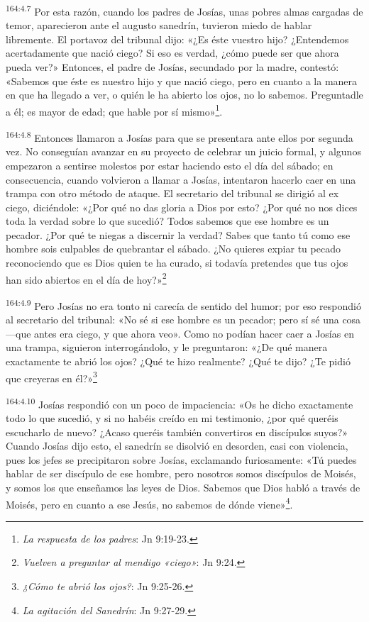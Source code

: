 \par
\textsuperscript{164:4.7} Por esta razón, cuando los padres de Josías, unas pobres almas cargadas de temor, aparecieron ante el augusto sanedrín, tuvieron miedo de hablar libremente. El portavoz del tribunal dijo: «¿Es éste vuestro hijo? ¿Entendemos acertadamente que nació ciego? Si eso es verdad, ¿cómo puede ser que ahora pueda ver?» Entonces, el padre de Josías, secundado por la madre, contestó: «Sabemos que éste es nuestro hijo y que nació ciego, pero en cuanto a la manera en que ha llegado a ver, o quién le ha abierto los ojos, no lo sabemos. Preguntadle a él; es mayor de edad; que hable por sí mismo»\footnote{\textit{La respuesta de los padres}: Jn 9:19-23.}.

\par
\textsuperscript{164:4.8} Entonces llamaron a Josías para que se presentara ante ellos por segunda vez. No conseguían avanzar en su proyecto de celebrar un juicio formal, y algunos empezaron a sentirse molestos por estar haciendo esto el día del sábado; en consecuencia, cuando volvieron a llamar a Josías, intentaron hacerlo caer en una trampa con otro método de ataque. El secretario del tribunal se dirigió al ex ciego, diciéndole: «¿Por qué no das gloria a Dios por esto? ¿Por qué no nos dices toda la verdad sobre lo que sucedió? Todos sabemos que ese hombre es un pecador. ¿Por qué te niegas a discernir la verdad? Sabes que tanto tú como ese hombre sois culpables de quebrantar el sábado. ¿No quieres expiar tu pecado reconociendo que es Dios quien te ha curado, si todavía pretendes que tus ojos han sido abiertos en el día de hoy?»\footnote{\textit{Vuelven a preguntar al mendigo «ciego»}: Jn 9:24.}

\par
\textsuperscript{164:4.9} Pero Josías no era tonto ni carecía de sentido del humor; por eso respondió al secretario del tribunal: «No sé si ese hombre es un pecador; pero sí sé una cosa ---que antes era ciego, y que ahora veo». Como no podían hacer caer a Josías en una trampa, siguieron interrogándolo, y le preguntaron: «¿De qué manera exactamente te abrió los ojos? ¿Qué te hizo realmente? ¿Qué te dijo? ¿Te pidió que creyeras en él?»\footnote{\textit{¿Cómo te abrió los ojos?}: Jn 9:25-26.}

\par
\textsuperscript{164:4.10} Josías respondió con un poco de impaciencia: «Os he dicho exactamente todo lo que sucedió, y si no habéis creído en mi testimonio, ¿por qué queréis escucharlo de nuevo? ¿Acaso queréis también convertiros en discípulos suyos?» Cuando Josías dijo esto, el sanedrín se disolvió en desorden, casi con violencia, pues los jefes se precipitaron sobre Josías, exclamando furiosamente: «Tú puedes hablar de ser discípulo de ese hombre, pero nosotros somos discípulos de Moisés, y somos los que enseñamos las leyes de Dios. Sabemos que Dios habló a través de Moisés, pero en cuanto a ese Jesús, no sabemos de dónde viene»\footnote{\textit{La agitación del Sanedrín}: Jn 9:27-29.}.

